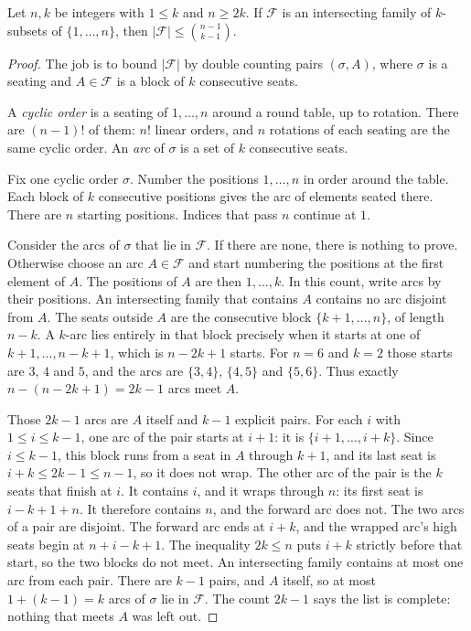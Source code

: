 \begin{theorem}\label{orders:thm:ekr}
Let $n,k$ be integers with $1\le k$ and $n\ge 2k$. If $\mathcal F$ is an intersecting family of $k$-subsets of $\{1,\dots,n\}$, then $|\mathcal F|\le\binom{n-1}{k-1}$.
\end{theorem}
\begin{proof}
The job is to bound $|\mathcal F|$ by double counting pairs $(\sigma,A)$, where $\sigma$ is a seating and $A\in\mathcal F$ is a block of $k$ consecutive seats.

A \emph{cyclic order} is a seating of $1,\dots,n$ around a round table, up to rotation. There are $(n-1)!$ of them: $n!$ linear orders, and $n$ rotations of each seating are the same cyclic order. An \emph{arc} of $\sigma$ is a set of $k$ consecutive seats.

Fix one cyclic order $\sigma$. Number the positions $1,\dots,n$ in order around the table. Each block of $k$ consecutive positions gives the arc of elements seated there. There are $n$ starting positions. Indices that pass $n$ continue at $1$.

Consider the arcs of $\sigma$ that lie in $\mathcal F$. If there are none, there is nothing to prove. Otherwise choose an arc $A\in\mathcal F$ and start numbering the positions at the first element of $A$. The positions of $A$ are then $1,\dots,k$. In this count, write arcs by their positions. An intersecting family that contains $A$ contains no arc disjoint from $A$. The seats outside $A$ are the consecutive block $\{k+1,\dots,n\}$, of length $n-k$. A $k$-arc lies entirely in that block precisely when it starts at one of $k+1,\dots,n-k+1$, which is $n-2k+1$ starts. For $n=6$ and $k=2$ those starts are $3$, $4$ and $5$, and the arcs are $\{3,4\}$, $\{4,5\}$ and $\{5,6\}$. Thus exactly $n-(n-2k+1)=2k-1$ arcs meet $A$.

Those $2k-1$ arcs are $A$ itself and $k-1$ explicit pairs. For each $i$ with $1\le i\le k-1$, one arc of the pair starts at $i+1$: it is $\{i+1,\dots,i+k\}$. Since $i\le k-1$, this block runs from a seat in $A$ through $k+1$, and its last seat is $i+k\le 2k-1\le n-1$, so it does not wrap. The other arc of the pair is the $k$ seats that finish at $i$. It contains $i$, and it wraps through $n$: its first seat is $i-k+1+n$. It therefore contains $n$, and the forward arc does not. The two arcs of a pair are disjoint. The forward arc ends at $i+k$, and the wrapped arc's high seats begin at $n+i-k+1$. The inequality $2k\le n$ puts $i+k$ strictly before that start, so the two blocks do not meet. An intersecting family contains at most one arc from each pair. There are $k-1$ pairs, and $A$ itself, so at most $1+(k-1)=k$ arcs of $\sigma$ lie in $\mathcal F$. The count $2k-1$ says the list is complete: nothing that meets $A$ was left out.


\end{proof}
